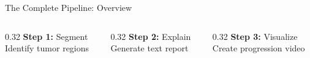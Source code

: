 \documentclass[aspectratio=169,xcolor=dvipsnames]{beamer}
\begin{document}
\begin{frame}{The Complete Pipeline: Overview}
    \begin{columns}
        \begin{column}{0.32\textwidth}
            \centering
            \textbf{Step 1:} Segment\\
            \small Identify tumor regions
        \end{column}
        \begin{column}{0.32\textwidth}
            \centering
            \textbf{Step 2:} Explain\\
            \small Generate text report
        \end{column}
        \begin{column}{0.32\textwidth}
            \centering
            \textbf{Step 3:} Visualize\\
            \small Create progression video
        \end{column}
    \end{columns}
\end{frame}
\end{document}
